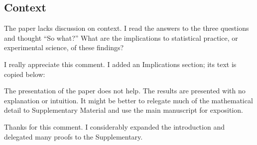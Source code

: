\begin{quote}
  
\end{quote}


\subsection{Context}
\RC The paper lacks discussion on context. I read the answers to the
three questions and thought “So what?”  What are the implications to
statistical practice, or experimental science, of these findings?

\AR I really appreciate this comment. I added an Implications
  section; its text is copied below:

  
  
  \begin{quote}
  \end{quote}
  



\RC The presentation of the paper does not help. The results are
presented with no explanation or intuition. It might be better to
relegate much of the mathematical detail to Supplementary Material and
use the main manuscript for exposition.

\AR Thanks for this comment. I considerably expanded the
  introduction and delegated many proofs to the Supplementary.


